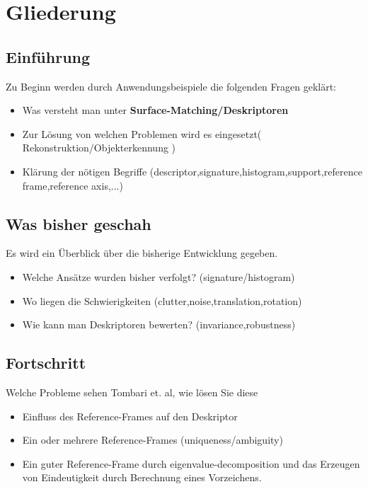 \documentclass[12pt]{article}
\begin{document}
\section{Gliederung}
\subsection{Einführung}




Zu Beginn werden durch Anwendungsbeispiele die folgenden Fragen geklärt:\\
\begin{itemize}
	\item Was versteht man unter \textbf{Surface-Matching/Deskriptoren}
	\item Zur Lösung von welchen Problemen wird es eingesetzt( Rekonstruktion/Objekterkennung )
	\item Klärung der nötigen Begriffe (descriptor,signature,histogram,support,reference frame,reference axis,...)
\end{itemize}
\subsection{Was bisher geschah}
Es wird ein Überblick über die bisherige Entwicklung gegeben.
\begin{itemize}
	\item Welche Ansätze wurden bisher verfolgt? (signature/histogram)
	\item Wo liegen die Schwierigkeiten (clutter,noise,translation,rotation)
	\item Wie kann man Deskriptoren bewerten? (invariance,robustness)
\end{itemize}
\subsection{Fortschritt}
Welche Probleme sehen Tombari et. al, wie lösen Sie diese
\begin{itemize}
	\item Einfluss des Reference-Frames auf den Deskriptor
	\item Ein oder mehrere Reference-Frames (uniqueness/ambiguity)
	\item Ein guter Reference-Frame durch eigenvalue-decomposition und das Erzeugen von Eindeutigkeit durch Berechnung eines Vorzeichens.
\end{itemize}
\end{document}
